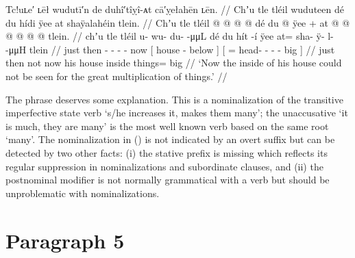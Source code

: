 \ex\label{ex:90-51-cant-be-seen-for-plenty}%
%
\begingl
	\glpreamble	Tc!uʟe′ ʟēł wudutī′n de duhî′tîỵî-ᴀt cā′ỵełahēn ʟēn. //
	\glpreamble	Chʼu tle tléil wuduteen dé du hídi ÿee at shaÿalahéin tlein. //
	\gla	Chʼu tle tléil
		 @ {} @ {} @ {} @ {}
		dé
		{} du  @ {} ÿee {} +
		{} at @  @ {} @ {} @ {} @ {} @ {} tlein. {} //
	\glb	chʼu tle tléil
		u- wu- du-  -μμL
		dé
		{} du hít -í ÿee {}
		{} at= sha- ÿ- l-  -μμH {} tlein {} //
	\glc	just then 
		- - -  -
		now
		{}[  house - below {}]
		{}[ = head- - -  - \· big {}] //
	\gld	just then not
		 {} {} {} {}
		now
		{} his house {} inside {}
		{} things=  {} {} {} {} {} big {} //
	\glft	‘Now the inside of his house could not be seen for the great multiplication of things.’
		//
\endgl
\xe

The phrase  deserves some explanation.
This is a nominalization of the transitive imperfective state verb  ‘s/he increases it, makes them many’; the unaccusative  ‘it is much, they are many’ is the most well known verb based on the same root  ‘many’.
The nominalization in (\lastx) is not indicated by an overt suffix but can be detected by two other facts: (i) the stative  prefix is missing which reflects its regular suppression in nominalizations and subordinate clauses, and (ii) the postnominal modifier  is not normally grammatical with a verb but should be unproblematic with nominalizations.

\clearpage
\section{Paragraph 5}\label{sec:90-para-5}

